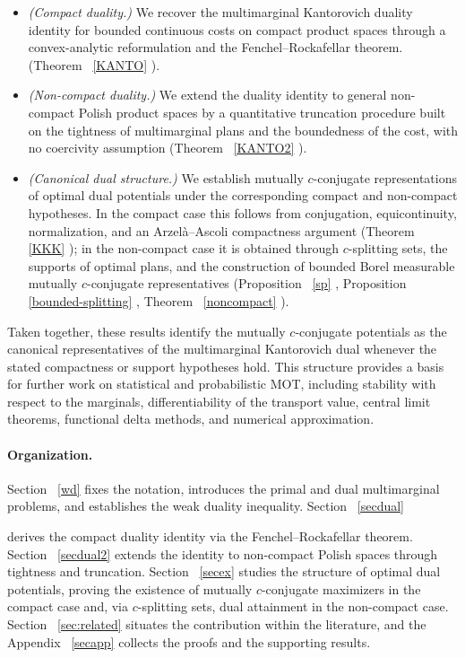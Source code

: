 \documentclass[twoside,11pt,a4paper]{article}
\newcommand*{\SavedRef}{}
\let\SavedRef\ref
\renewcommand*{\ref}[1]{  \begingroup
    \hypersetup{
      linkcolor=linkequation,
      linkbordercolor=linkequation,
    }    \SavedRef{#1}  \endgroup
}
\begin{document}
\begin{itemize}
\item \emph{(Compact duality.)} We recover the multimarginal Kantorovich duality
identity for bounded continuous costs on compact product spaces through a
convex-analytic reformulation and the Fenchel--Rockafellar theorem. (Theorem~\ref{KANTO}).

\item \emph{(Non-compact duality.)} We extend the duality identity to general
non-compact Polish product spaces by a quantitative truncation procedure built on
the tightness of multimarginal plans and the boundedness of the cost, with no
coercivity assumption (Theorem~\ref{KANTO2}).

\item \emph{(Canonical dual structure.)} We establish mutually \(c\)-conjugate representations of optimal dual potentials under the corresponding compact and non-compact hypotheses. In the compact case this follows from
conjugation, equicontinuity, normalization, and an Arzelà--Ascoli compactness
argument (Theorem~\ref{KKK}); in the non-compact case it is obtained through
$c$-splitting sets, the supports of optimal plans, and the construction of
bounded Borel measurable mutually $c$-conjugate representatives
(Proposition~\ref{sp}, Proposition~\ref{bounded-splitting},
Theorem~\ref{noncompact}).
\end{itemize}
Taken together, these results identify the mutually $c$-conjugate potentials as
the canonical representatives of the multimarginal Kantorovich dual whenever the
stated compactness or support hypotheses hold. This structure provides a basis for further work on statistical and probabilistic MOT, including stability with respect to the marginals, differentiability of the transport value, central limit theorems, functional delta methods, and numerical approximation.

\paragraph{Organization.}
Section~\ref{wd} fixes the notation, introduces the primal and dual multimarginal
problems, and establishes the weak duality inequality. Section~\ref{secdual}
derives the compact duality identity via the Fenchel--Rockafellar theorem.
Section~\ref{secdual2} extends the identity to non-compact Polish spaces through
tightness and truncation. Section~\ref{secex} studies the structure of optimal
dual potentials, proving the existence of mutually $c$-conjugate maximizers in the
compact case and, via $c$-splitting sets, dual attainment in the non-compact case.
Section~\ref{sec:related} situates the contribution within the literature, and the
Appendix~\ref{secapp} collects the proofs and the supporting results.
\end{document}
